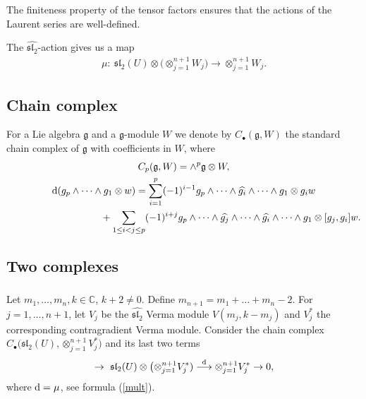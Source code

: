 The finiteness property of the tensor factors ensures that the actions of the Laurent series are well-defined.

The $\widehat{{\mathfrak{sl}_2}}$-action gives us a map
\begin{gather}\label{mult}
\mu\colon \ \mathfrak{sl}_2(U)\otimes \big(\otimes_{j=1}^{n+1} W_j\big) \to \otimes_{j=1}^{n+1} W_j .
\end{gather}

\subsection{Chain complex}
For a Lie algebra ${\mathfrak g}$ and a ${\mathfrak g}$-module $W$ we denote by $C_{\bullet}({\mathfrak g}, W)$ the standard chain complex of ${\mathfrak g}$ with coefficients in $W$, where
\begin{gather*}
 C_p({\mathfrak g}, W) = \wedge ^p{\mathfrak g} \otimes W, \\
{\rm d}(g_p\wedge \dots\wedge g_1\otimes w) = \sum_{i=1}^p(-1)^{i-1} g_p\wedge \dots\wedge \widehat{g_i}\wedge\dots \wedge g_1\otimes g_iw \\
\hphantom{{\rm d}(g_p\wedge \dots\wedge g_1\otimes w) =}{} + \sum_{1\leq i<j\leq p}(-1)^{i+j} g_p\wedge \dots\wedge \widehat{g_j}\wedge\dots\wedge \widehat{g_i}\wedge\dots \wedge g_1\otimes [g_j,g_i]w.
\end{gather*}

\subsection{Two complexes}

\subsubsection{} Let $m_1,\dots,m_n, k\in{\mathbb C} $, $k+2\ne 0$. Define $m_{n+1}=m_1+\dots+m_n-2$. For $j=1,\dots, n+1$, let $V_j$ be the $\widehat{{\mathfrak{sl}_2}}$ Verma module $V(m_j,k-m_j)$ and $V_j^*$ the corresponding contragradient Verma module. Consider the chain complex $C_{\bullet}\big(\mathfrak{sl}_2(U), \otimes_{j=1}^{n+1}V_j^*\big)$ and its last two terms{\samepage
\begin{gather*}%
\to\ \mathfrak{sl}_2(U) \otimes \big({\otimes}_{j=1}^{n+1}V_j^*)\overset{{\rm d}}{\longrightarrow} \otimes_{j=1}^{n+1}V_j^* \to 0,
\end{gather*}
where ${\rm d}=\mu$, see formula (\ref{mult}).}

